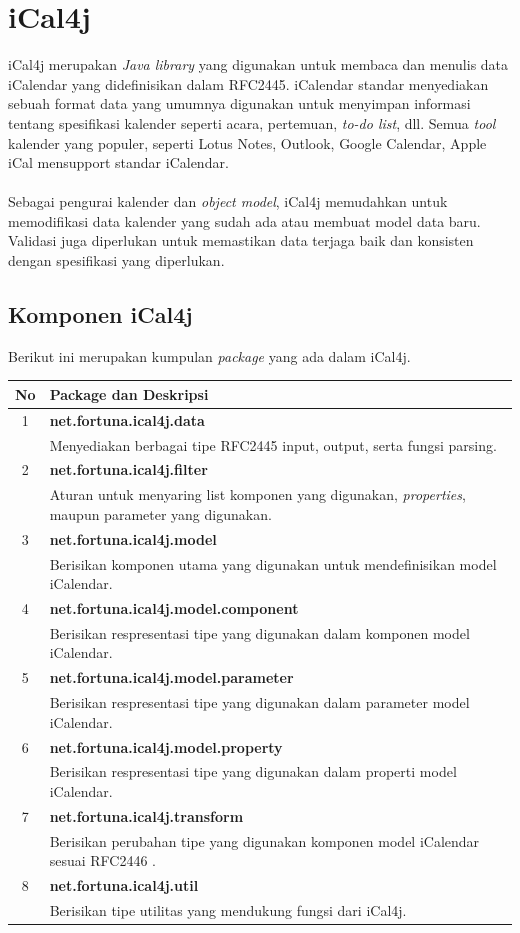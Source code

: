 \section{iCal4j}
iCal4j merupakan \textit{Java library} yang digunakan untuk membaca dan menulis data iCalendar yang didefinisikan dalam RFC2445. iCalendar standar menyediakan sebuah format data yang umumnya digunakan untuk menyimpan informasi tentang spesifikasi kalender seperti acara, pertemuan, \textit{to-do list}, dll. Semua \textit{tool} kalender yang populer, seperti Lotus Notes, Outlook, Google Calendar, Apple iCal mensupport standar iCalendar.\cite{ical}
\\ \\
Sebagai pengurai kalender dan \textit{object model}, iCal4j memudahkan untuk memodifikasi data kalender yang sudah ada atau membuat model data baru. Validasi juga diperlukan untuk memastikan data terjaga baik dan konsisten dengan spesifikasi yang diperlukan.\cite{ical}


\subsection{Komponen iCal4j}
Berikut ini merupakan kumpulan \textit{package} yang ada dalam iCal4j.\cite{ical}\\
\begin{tabular}{|c|p{12cm}|}
		\hline
		\textbf{No} & \textbf{Package dan Deskripsi} \\ \hline \hline
		1 & \textbf{net.fortuna.ical4j.data}\\
			&	Menyediakan berbagai tipe RFC2445 input, output, serta fungsi parsing.\\ \hline
		2 & \textbf{net.fortuna.ical4j.filter}\\
			&	Aturan untuk menyaring list komponen yang digunakan, \textit{properties}, maupun parameter yang digunakan.\\ \hline
		3 & \textbf{net.fortuna.ical4j.model}\\
			&	Berisikan komponen utama yang digunakan untuk mendefinisikan model iCalendar.\\ \hline
		4 & \textbf{net.fortuna.ical4j.model.component	
}\\
			&	Berisikan respresentasi tipe yang digunakan dalam komponen model iCalendar.\\ \hline
		5 & \textbf{net.fortuna.ical4j.model.parameter}\\
			&	Berisikan respresentasi tipe yang digunakan dalam parameter model iCalendar.\\ \hline
		6 & \textbf{net.fortuna.ical4j.model.property}\\
			&	Berisikan respresentasi tipe yang digunakan dalam properti model iCalendar.\\ \hline
		7 & \textbf{net.fortuna.ical4j.transform}\\
			&	Berisikan perubahan tipe yang digunakan komponen model iCalendar sesuai RFC2446   .\\ \hline
		8 & \textbf{net.fortuna.ical4j.util}\\
			&	Berisikan tipe utilitas yang mendukung fungsi dari iCal4j.\\ \hline							
	\end{tabular}

